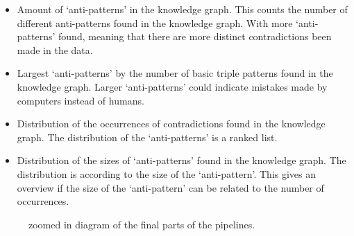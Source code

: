 \documentclass[11pt,letterpaper ,oneside ]{book}
\begin{document}
	\begin{itemize}
		\item Amount of `anti-patterns' in the knowledge graph. This counts the number of different anti-patterns found in the knowledge graph. With more `anti-patterns' found, meaning that there are more distinct contradictions been made in the data.
		\item Largest `anti-patterns' by the number of basic triple patterns found in the knowledge graph. Larger `anti-patterns' could indicate mistakes made by computers instead of humans.
		\item Distribution of the occurrences of contradictions found in the knowledge graph. The distribution of the `anti-patterns' is a ranked list. 
		\item Distribution of the sizes of `anti-patterns' found in the knowledge graph. The distribution is according to the size of the `anti-pattern'. This gives an overview if the size of the `anti-pattern' can be related to the number of occurrences.
	\end{itemize} 
	\begin{figure}[!t]
		\caption{zoomed in diagram of the final parts of the pipelines.}
		\label{fig:PipelinePart45}
	\end{figure}
	
\end{document}
